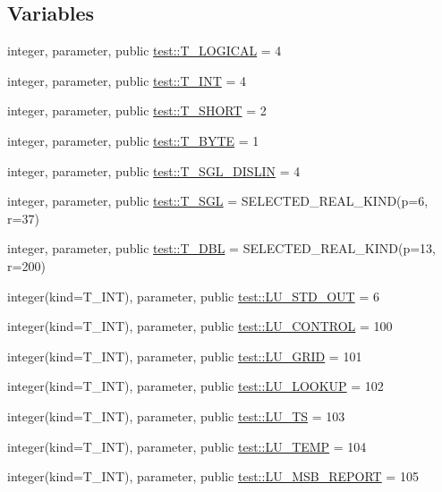 \subsection*{Variables}
\begin{DoxyCompactItemize}
\item 
integer, parameter, public \hyperlink{namespacetest_acdeac586276a7d1d394fb5eddc77fc3d}{test::T\_\-LOGICAL} = 4
\item 
integer, parameter, public \hyperlink{namespacetest_a6f91ebd89b58cfcc5da99faed9385c1e}{test::T\_\-INT} = 4
\item 
integer, parameter, public \hyperlink{namespacetest_a78d9db20f77ee4f9cf3ac5abfb7062b9}{test::T\_\-SHORT} = 2
\item 
integer, parameter, public \hyperlink{namespacetest_a3023425eff6a423b04bc28123a79fda5}{test::T\_\-BYTE} = 1
\item 
integer, parameter, public \hyperlink{namespacetest_ade95807442cb41fc39b288b86e82bccd}{test::T\_\-SGL\_\-DISLIN} = 4
\item 
integer, parameter, public \hyperlink{namespacetest_a04d8b9090502de3a00046fe904bc3d99}{test::T\_\-SGL} = SELECTED\_\-REAL\_\-KIND(p=6, r=37)
\item 
integer, parameter, public \hyperlink{namespacetest_af379b935264d350d76bf75331181e241}{test::T\_\-DBL} = SELECTED\_\-REAL\_\-KIND(p=13, r=200)
\item 
integer(kind=T\_\-INT), parameter, public \hyperlink{namespacetest_ae2c473e7eff311b67b82175c92417cea}{test::LU\_\-STD\_\-OUT} = 6
\item 
integer(kind=T\_\-INT), parameter, public \hyperlink{namespacetest_ae6a297220869ce598523186f326bef7c}{test::LU\_\-CONTROL} = 100
\item 
integer(kind=T\_\-INT), parameter, public \hyperlink{namespacetest_a5255cf8d0506fee4cf94c76d1bcb541d}{test::LU\_\-GRID} = 101
\item 
integer(kind=T\_\-INT), parameter, public \hyperlink{namespacetest_a269ea2c4032752326f4745d24712c02f}{test::LU\_\-LOOKUP} = 102
\item 
integer(kind=T\_\-INT), parameter, public \hyperlink{namespacetest_a1a6873182d00ba61beb421697cbe8662}{test::LU\_\-TS} = 103
\item 
integer(kind=T\_\-INT), parameter, public \hyperlink{namespacetest_a3f833495aa697889b22b2de1d999641c}{test::LU\_\-TEMP} = 104
\item 
integer(kind=T\_\-INT), parameter, public \hyperlink{namespacetest_a72b7d2a48ea511f8adea59b1392f541c}{test::LU\_\-MSB\_\-REPORT} = 105

\end{DoxyCompactItemize}
